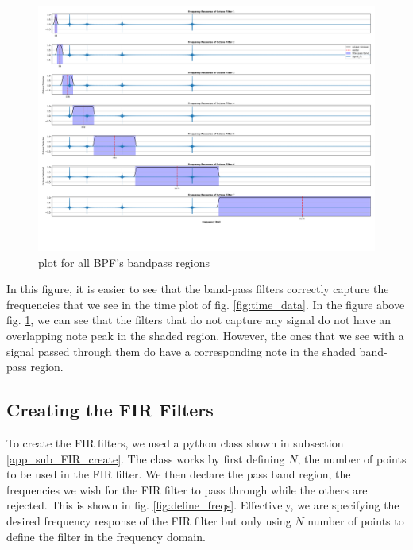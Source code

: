 \documentclass[a4paper, 11pt]{exam}
\begin{document}
\begin{figure}[h!]
  \centering
  \hspace*{-1.5cm}\includegraphics[width=15cm]{../images/post_lock_fft_freqdata.png}
  \caption{plot for all BPF's bandpass regions}
  \label{fig:bandpass_regions}
\end{figure}
In this figure, it is easier to see that the band-pass filters correctly capture the frequencies that we see in the time plot of fig. \ref{fig:time_data}. In the figure above fig. \ref{fig:bandpass_regions}, we can see that the filters that do not capture any signal do not have an overlapping note peak in the shaded region. However, the ones that we see with a signal passed through them do have a corresponding note in the shaded band-pass region. 

\subsection{Creating the FIR Filters}
To create the FIR filters, we used a python class shown in subsection \ref{app_sub_FIR_create}. The class works by first defining $N$, the number of points to be used in the FIR filter. We then declare the pass band region, the frequencies we wish for the FIR filter to pass through while the others are rejected. This is shown in fig. \ref{fig:define_freqs}. Effectively, we are specifying the desired frequency response of the FIR filter but only using $N$ number of points to define the filter in the frequency domain.
\end{document}
